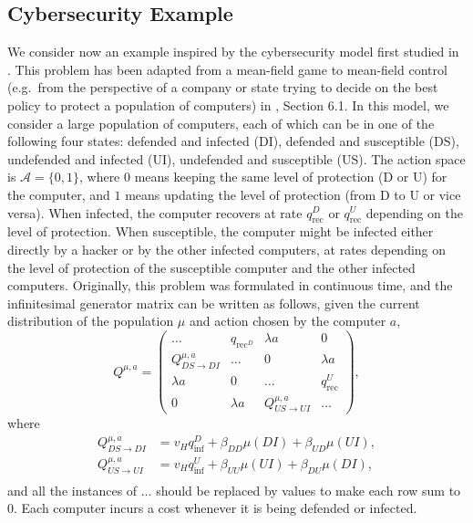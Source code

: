 \documentclass[11pt]{article}
\numberwithin{equation}{section}
\theoremstyle{definition}
\theoremstyle{remark}
\def\cA{\mathcal{A}}
\begin{document}
\subsection{Cybersecurity Example}

We consider now an example inspired by the cybersecurity model first studied in \cite{kolokoltsov2016mean}. This problem has been adapted from a mean-field game to mean-field control (e.g.\ from the perspective of a company or state trying to decide on the best policy to protect a population of computers) in \cite{carmona2023model}, Section 6.1.
In this model, we consider a large population of computers, each of which can be in one of the following four states: defended and infected (DI), defended and susceptible (DS), undefended and infected (UI), undefended and susceptible (US). 
The action space is $\cA = \{0,1\}$, where $0$ means keeping the same level of protection (D or U) for the computer, and $1$ means updating the level of protection (from D to U or vice versa). 
When infected, the computer recovers at rate $q_{\mathrm{rec}}^D$ or $q_{\mathrm{rec}}^U$ depending on the level of protection.
When susceptible, the computer might be infected either directly by a hacker or by the other infected computers, at rates depending on the level of protection of the susceptible computer and the other infected computers.
Originally, this problem was formulated in continuous time, and the infinitesimal generator matrix can be written as follows, given the current distribution of the population $\mu$ and action chosen by the computer $a$,
\[
Q^{\mu, a} = 
\begin{pmatrix}
    \ldots & q_{\mathrm{rec}^D} & \lambda a & 0 \\
    Q_{DS \to DI}^{\mu, a} & \ldots & 0 & \lambda a \\
    \lambda a & 0 & \ldots & q_{\mathrm{rec}}^U \\
    0 & \lambda a & Q_{US \to UI}^{\mu, a} & \ldots
\end{pmatrix},
\]
where
\[
\begin{aligned}
Q_{DS \to DI}^{\mu, a} &= v_H q_{\mathrm{inf}}^D + \beta_{DD} \mu (DI) + \beta_{UD} \mu (UI), \\
Q_{US \to UI}^{\mu, a} &= v_H q_{\mathrm{inf}}^U + \beta_{UU} \mu (UI) + \beta_{DU} \mu (DI), \\
\end{aligned}
\]
and all the instances of $\ldots$ should be replaced by values to make each row sum to $0$.
Each computer incurs a cost whenever it is being defended or infected.
\end{document}
